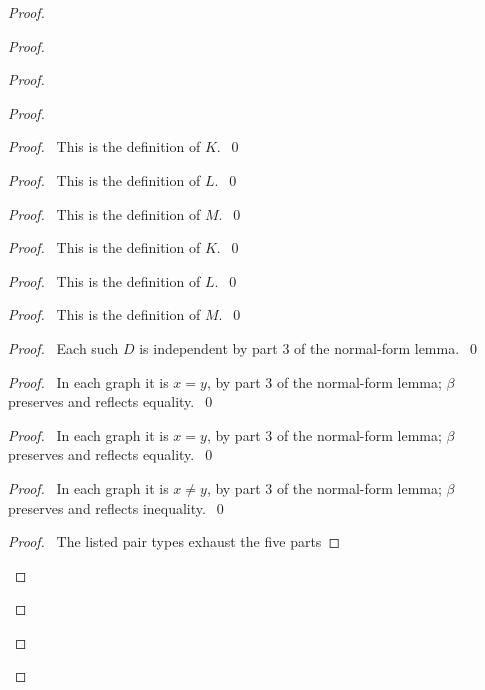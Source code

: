 \begin{proof}
\begin{proof}
\begin{proof}
\begin{proof}
    \begin{proof}\pf\ This is the definition of $K$.~\qed\end{proof}
    \begin{proof}\pf\ This is the definition of $L$.~\qed\end{proof}
    \begin{proof}\pf\ This is the definition of $M$.~\qed\end{proof}
    \begin{proof}\pf\ This is the definition of $K$.~\qed\end{proof}
    \begin{proof}\pf\ This is the definition of $L$.~\qed\end{proof}
    \begin{proof}\pf\ This is the definition of $M$.~\qed\end{proof}
    \begin{proof}\pf\ Each such $D$ is independent by part 3 of the normal-form lemma.~\qed\end{proof}
    \begin{proof}\pf\ In each graph it is $x=y$, by part 3 of the normal-form lemma; $\beta$ preserves and reflects equality.~\qed\end{proof}
    \begin{proof}\pf\ In each graph it is $x=y$, by part 3 of the normal-form lemma; $\beta$ preserves and reflects equality.~\qed\end{proof}
    \begin{proof}\pf\ In each graph it is $x\ne y$, by part 3 of the normal-form lemma; $\beta$ preserves and reflects inequality.~\qed\end{proof}
    \qedstep
    \begin{proof}\pf\ The listed pair types exhaust the five parts

\end{proof}
\end{proof}
\end{proof}
\end{proof}
\end{proof}
